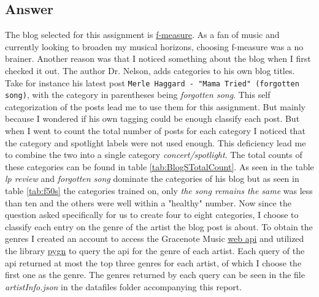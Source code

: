 \documentclass[letterpaper,10pt]{article}
\begin{document}
\subsection*{Answer}
The blog selected for this assignment is \href{http://f-measure.blogspot.com/}{f-measure}. As a fan of music and currently looking to broaden my musical horizons, choosing f-measure was a no brainer. Another reason was that I noticed something about the blog when I first checked it out. The author Dr. Nelson, adds categories to his own blog titles. Take for instance his latest post \verb+Merle Haggard - "Mama Tried" (forgotten song)+, with the category in parentheses being \emph{forgotten song}. This self categorization of the posts lead me to use them for this assignment. But mainly because I wondered if his own tagging could be enough classify each post.\newline \newline
But when I went to count the total number of posts for each category I noticed that the category and spotlight labels were not used enough. This deficiency lead me to combine the two into a single category \emph{concert/spotlight}. The total counts of these categories can be found in table \hyperref[tab:BlogSTotalCount]{\ref{tab:BlogSTotalCount}}. As seen in the table \emph{lp review} and \emph{forgotten song} dominate the categories of his blog but as seen in table \hyperref[tab:f50s]{\ref{tab:f50s}} the categories trained on, only \emph{the song remains the same} was less than ten and the others were well within a "healthy" number.
\newline \newline
Now since the question asked specifically for us to create four to eight categories, I choose to classify each entry on the genre of the artist the blog post is about. To obtain the genres I created an account to access the Gracenote Music \href{https://developer.gracenote.com/web-api}{web api} and utilized the library \href{https://github.com/cweichen/pygn}{pygn} to query the api for the genre of each artist. Each query of the api returned at most the top three genres for each artist, of which I choose the first one as the genre. The genres returned by each query can be seen in the file \emph{artistInfo.json} in the datafiles folder accompanying this report.\newline \newline  
\end{document}

